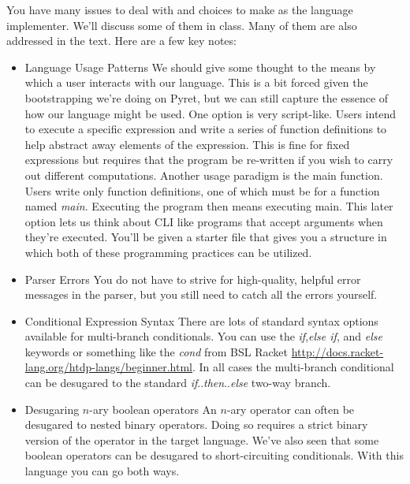 \documentclass[10pt]{article}
\begin{document}
You have many issues to deal with and choices to make as the language implementer. We'll discuss some of them in class. Many of them are also addressed in the text. Here are a few key notes:
\begin{itemize}
\item Language Usage Patterns
\newline
We should give some thought to the means by which a user interacts with our language. This is a bit forced given the bootstrapping we're doing on Pyret, but we can still capture the essence of how our language might be used.  
One option is very script-like. Users intend to execute a specific expression and write a series of function definitions to help abstract away elements of the expression. This is fine for fixed expressions but requires that the program be re-written if you wish to carry out different computations. 
Another usage paradigm is the main function. Users write only function definitions, one of which must be for a function named \textit{main}.  Executing the program then means executing main. This later option lets us think about CLI like programs that accept arguments when they're executed.  
You'll be given a starter file that gives you a structure in which both of these programming practices can be utilized.

\item Parser Errors
\newline
You do not have to strive for high-quality, helpful error messages in the parser, but you still need to catch all the errors yourself.  

\item Conditional Expression Syntax 
\newline 
There are lots of standard syntax options available for multi-branch conditionals. You can use the \textit{if},\textit{else if}, and \textit{else} keywords or something like the \textit{cond} from BSL Racket \url{http://docs.racket-lang.org/htdp-langs/beginner.html}.  In all cases the multi-branch conditional can be desugared to the standard \textit{if}..\textit{then}..\textit{else} two-way branch. 

\item Desugaring $n$-ary boolean operators
\newline
An $n$-ary operator can often be desugared to nested binary operators. Doing so requires a strict binary version of the operator in the target language. We've also seen that some boolean operators can be desugared to short-circuiting conditionals. With this language you can go both ways. 


\end{itemize}
\end{document}
